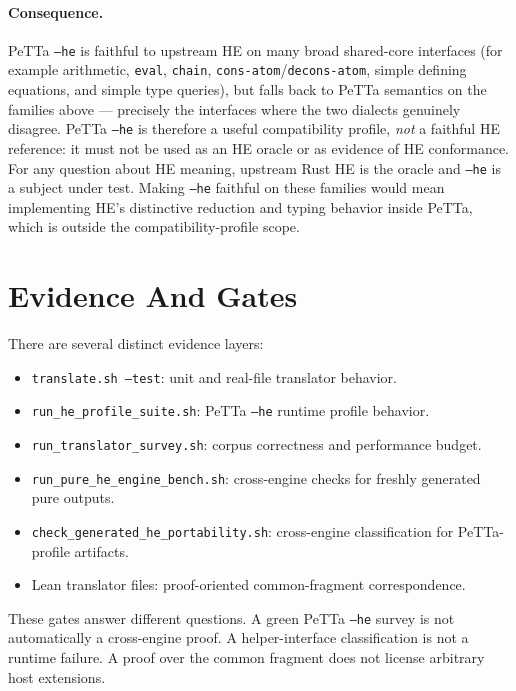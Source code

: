 \documentclass[11pt]{article}
\newcommand{\code}[1]{\texttt{#1}}
\newcommand{\HE}{\textup{HE}}
\newcommand{\PeTTa}{\textup{PeTTa}}
\begin{document}
\paragraph{Consequence.}
\PeTTa{} \code{--he} is faithful to upstream \HE{} on many broad shared-core
interfaces (for example arithmetic, \code{eval}, \code{chain},
\code{cons-atom}/\code{decons-atom}, simple defining equations, and simple type
queries), but falls back to \PeTTa{} semantics on the families above ---
precisely the interfaces where the two dialects genuinely disagree.  \PeTTa{}
\code{--he} is
therefore a useful compatibility profile, \emph{not} a faithful \HE{} reference:
it must not be used as an \HE{} oracle or as evidence of \HE{} conformance.  For
any question about \HE{} meaning, upstream Rust \HE{} is the oracle and
\code{--he} is a subject under test.  Making \code{--he} faithful on these
families would mean implementing \HE{}'s distinctive reduction and typing
behavior inside \PeTTa{}, which is outside the compatibility-profile scope.

\section{Evidence And Gates}

There are several distinct evidence layers:

\begin{itemize}
\item \code{translate.sh --test}: unit and real-file translator behavior.
\item \code{run\_he\_profile\_suite.sh}: \PeTTa{} \code{--he} runtime profile behavior.
\item \code{run\_translator\_survey.sh}: corpus correctness and performance budget.
\item \code{run\_pure\_he\_engine\_bench.sh}: cross-engine checks for freshly generated pure outputs.
\item \code{check\_generated\_he\_portability.sh}: cross-engine classification for \PeTTa{}-profile artifacts.
\item Lean translator files: proof-oriented common-fragment correspondence.
\end{itemize}

These gates answer different questions.  A green \PeTTa{} \code{--he} survey is
not automatically a cross-engine proof.  A helper-interface classification is not
a runtime failure.  A proof over the common fragment does not license arbitrary
host extensions.
\end{document}
